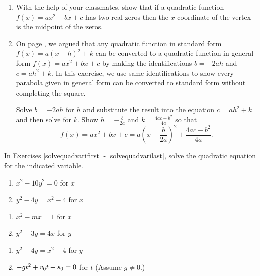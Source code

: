 \documentclass{ximera}
\begin{document}
\begin{enumerate}
\item With the help of your classmates, show that if a quadratic function $f(x) = ax^{2} + bx + c$ has two real zeros then the $x$-coordinate of the vertex is the midpoint of the zeros.

\item  \label{avoidcompsquare}  On page \pageref{standardtogeneraldiscussion}, we argued that any quadratic function in standard form $f(x) = a(x-h)^2+k$ can be converted to a quadratic function in general form $f(x) = ax^2+bx+c$ by making the identifications $b=-2ah$ and $c = ah^2+k$.  In this exercise, we use same identifications to show every parabola given in general form can be converted to standard form without completing the square.

\smallskip

Solve $b=-2ah$ for $h$ and substitute the result into the equation $c = ah^2+k$ and then solve for $k$.  Show  $h = -\frac{b}{2a}$ and $k = \frac{4ac-b^2}{4a}$ so that \[ f(x) = ax^2+bx+c = a\left(x + \dfrac{b}{2a}\right)^2  + \dfrac{4ac - b^2}{4a}. \]

\setcounter{HW}{\value{enumi}}
\end{enumerate}

In Exercises \ref{solvequadvarifirst} - \ref{solvequadvarilast}, solve the quadratic equation for the indicated variable.

\begin{multicols}{2}
\begin{enumerate}
\setcounter{enumi}{\value{HW}}


\item $x^{2} - 10y^{2} = 0$ for $x$ \label{solvequadvarifirst}
\item $y^{2} - 4y = x^{2} - 4$ for $x$

\setcounter{HW}{\value{enumi}}
\end{enumerate}
\end{multicols}

\begin{multicols}{2}
\begin{enumerate}
\setcounter{enumi}{\value{HW}}

\item $x^{2} - mx = 1$ for $x$
\item $y^{2} - 3y = 4x$ for $y$

\setcounter{HW}{\value{enumi}}
\end{enumerate}
\end{multicols}

\begin{multicols}{2}
\begin{enumerate}
\setcounter{enumi}{\value{HW}}



\item $y^{2} - 4y = x^{2} - 4$ for $y$
\item $-gt^{2} + v_{\mbox{\scriptsize $0$}}t + s_{\mbox{\scriptsize $0$}} = 0$ for $t$ (Assume $g \neq 0$.) \label{solvequadvarilast}

\setcounter{HW}{\value{enumi}}
\end{enumerate}
\end{multicols}
\end{document}
